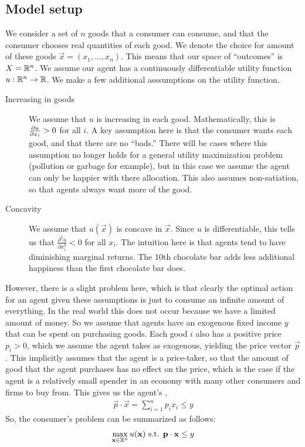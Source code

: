 \subsection*{Model setup}
We consider a set of $n$ goods that a consumer can consume, and that the consumer chooses real quantities of each good. We denote the choice for amount of these goods $\vec{x} = (x_1, \dots, x_n)$. This means that our space of ``outcomes'' is $X = \mathbb{R}^n$. We assume our agent has a continuously differentiable utility function $u: \mathbb{R}^n \to \mathbb{R}$. We make a few additional asssumptions on the utility function.
\begin{description}
    \item[Increasing in goods] We assume that $u$ is increasing in each good. Mathematically, this is $\frac{\partial u}{\partial x_i} > 0$ for all $i$. A key assumption here is that the consumer wants each good, and that there are no ``bads.'' There will be cases where this assumption no longer holds for a general utility maximization problem (pollution or garbage for example), but in this case we assume the agent can only be happier with there allocation. This also assumes non-satiation, so that agents always want more of the good. 
    \item[Concavity] We assume that $u(\vec{x})$ is concave in $\vec{x}$. Since $u$ is differentiable, this tells us that $\frac{\partial^2 u}{\partial x_i^2} < 0$ for all $x_i$. The intuition here is that agents tend to have diminishing marginal returns. The 10th chocolate bar adds less additional happiness than the first chocolate bar does.
\end{description}

However, there is a slight problem here, which is that clearly the optimal action for an agent given these assumptions is just to consume an infinite amount of everything. In the real world this does not occur because we have a limited amount of money. So we assume that agents have an exogenous fixed income $y$ that can be spent on purchasing goods. Each good $i$ also has a positive price $p_i > 0$, which we assume the agent takes as exogenous, yielding the price vector $\vec{p}$. This implicitly assumes that the agent is a price-taker, so that the amount of good that the agent purchases has no effect on the price, which is the case if the agent is a relatively small spender in an economy with many other consumers and firms to buy from. This gives us the agent's ,
\begin{align*}
    \vec{p} \cdot \vec{x} = \sum_{i = 1}^n p_i x_i \leq y
\end{align*}
So, the consumer's problem can be summarized as follows:
\begin{align*}
    \max_{\mathbf{x} \in \mathbb{R}^n} u(\mathbf{x}) \text{ s.t. } \mathbf{p} \cdot \mathbf{x} \leq y
\end{align*}
